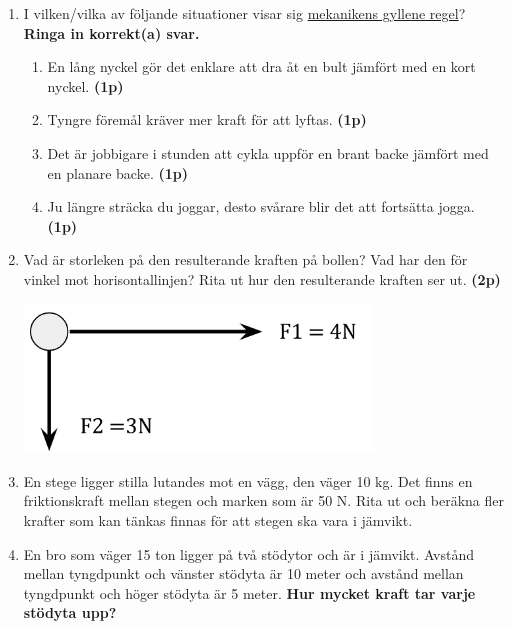 \documentclass[11pt]{article}
\begin{document}
\begin{enumerate}[itemsep=1em]
              \newpage
        \item
              I vilken/vilka av följande situationer visar sig \uline{mekanikens gyllene regel}? \textbf{Ringa in korrekt(a) svar.}
              \begin{enumerate}[label=\alph*)]
                      \item En lång nyckel gör det enklare att dra åt en bult jämfört med en kort nyckel. \textbf{(1p)}
                      \item Tyngre föremål kräver mer kraft för att lyftas. \textbf{(1p)}
                      \item Det är jobbigare i stunden att cykla uppför en brant backe jämfört med en planare backe. \textbf{(1p)}
                      \item Ju längre sträcka du joggar, desto svårare blir det att fortsätta jogga. \textbf{(1p)}
              \end{enumerate}

        \item
              Vad är storleken på den resulterande kraften på bollen? Vad har den för vinkel mot horisontallinjen? Rita ut hur den resulterande kraften ser ut. \textbf{(2p)}
              \begin{center}
                      \includegraphics[width=25em]{kraft1.png}
              \end{center}

        \item
              \begin{minipage}[t]{0.6\textwidth}
                      En stege ligger stilla lutandes mot en vägg, den väger 10 kg. Det finns en friktionskraft mellan stegen och marken som är 50 N. Rita ut och beräkna fler krafter som kan tänkas finnas för att stegen ska vara i jämvikt.
              \end{minipage}
              \hspace{2em}
              \begin{adjustbox}{valign=t}
                      
              \end{adjustbox}

        \item
              En bro som väger 15 ton ligger på två stödytor och är i jämvikt.  Avstånd mellan tyngdpunkt och vänster stödyta är 10 meter och avstånd mellan tyngdpunkt och höger stödyta är 5 meter.
              \textbf{Hur mycket kraft tar varje stödyta upp?}
              \begin{center}
                      
              \end{center}


\end{enumerate}
\end{document}
